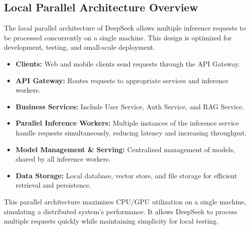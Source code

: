 \documentclass[a4paper,11pt]{article}
\begin{document}
\subsection{Local Parallel Architecture Overview}

The local parallel architecture of DeepSeek allows multiple inference requests to be processed concurrently on a single machine. This design is optimized for development, testing, and small-scale deployment.

\begin{itemize}
    \item \textbf{Clients:} Web and mobile clients send requests through the API Gateway.
    \item \textbf{API Gateway:} Routes requests to appropriate services and inference workers.
    \item \textbf{Business Services:} Include User Service, Auth Service, and RAG Service.
    \item \textbf{Parallel Inference Workers:} Multiple instances of the inference service handle requests simultaneously, reducing latency and increasing throughput.
    \item \textbf{Model Management \& Serving:} Centralized management of models, shared by all inference workers.
    \item \textbf{Data Storage:} Local database, vector store, and file storage for efficient retrieval and persistence.
\end{itemize}

This parallel architecture maximizes CPU/GPU utilization on a single machine, simulating a distributed system's performance. It allows DeepSeek to process multiple requests quickly while maintaining simplicity for local testing.
\end{document}
